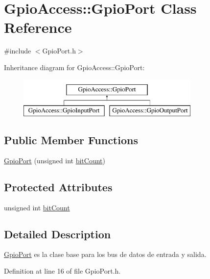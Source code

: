 \hypertarget{class_gpio_access_1_1_gpio_port}{\section{\-Gpio\-Access\-:\-:\-Gpio\-Port \-Class \-Reference}
\label{class_gpio_access_1_1_gpio_port}
}


{\ttfamily \#include $<$\-Gpio\-Port.\-h$>$}

\-Inheritance diagram for \-Gpio\-Access\-:\-:\-Gpio\-Port\-:\begin{figure}[H]
\begin{center}
\leavevmode
\includegraphics[height=2.000000cm]{class_gpio_access_1_1_gpio_port}
\end{center}
\end{figure}
\subsection*{\-Public \-Member \-Functions}
\begin{DoxyCompactItemize}
\item 
\hyperlink{class_gpio_access_1_1_gpio_port_aed72a6006ccc890557f66297d67b43cc}{\-Gpio\-Port} (unsigned int \hyperlink{class_gpio_access_1_1_gpio_port_a7708b465b3c98a32e592ee985c3dcf8b}{bit\-Count})
\end{DoxyCompactItemize}
\subsection*{\-Protected \-Attributes}
\begin{DoxyCompactItemize}
\item 
unsigned int \hyperlink{class_gpio_access_1_1_gpio_port_a7708b465b3c98a32e592ee985c3dcf8b}{bit\-Count}
\end{DoxyCompactItemize}


\subsection{\-Detailed \-Description}
\hyperlink{class_gpio_access_1_1_gpio_port}{\-Gpio\-Port} es la clase base para los bus de datos de entrada y salida. 

\-Definition at line 16 of file \-Gpio\-Port.\-h.



